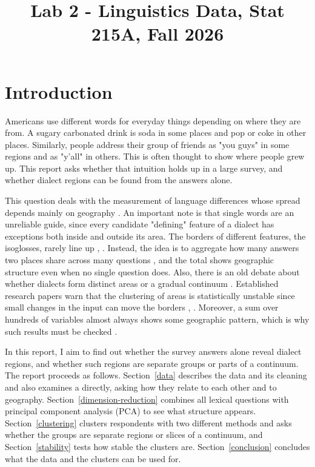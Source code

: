 \documentclass[10pt,letterpaper]{article}
\title{Lab 2 - Linguistics Data, Stat 215A, Fall 2026\vspace{-2em}}
\author{}
\date{}
\begin{document}
\maketitle

\section{Introduction}\label{introduction}

Americans use different words for everyday things depending on where they are from. A sugary carbonated drink is soda in some places and pop or coke in other places. Similarly, people address their group of friends as "you guys" in some regions and as "y'all" in others. This is often thought to show where people grew up. This report asks whether that intuition holds up in a large survey, and whether dialect regions can be found from the answers alone.

This question deals with the measurement of language differences whose spread depends mainly on geography \cite[p.~245]{nerbonne2003introducing}. An important note is that single words are an unreliable guide, since every candidate "defining" feature of a dialect has exceptions both inside and outside its area. The borders of different features, the isoglosses, rarely line up \cite[p.~246]{nerbonne2003introducing}, \cite[p.~388]{nerbonne2006progress}. Instead, the idea is to aggregate how many answers two places share across many questions \cite[p.~248]{nerbonne2003introducing}, and the total shows geographic structure even when no single question does. Also, there is an old debate about whether dialects form distinct areas or a gradual continuum \cite[p.~246]{nerbonne2003introducing}. Established research papers warn that the clustering of areas is statistically unstable since small changes in the input can move the borders \cite[p.~253]{nerbonne2003introducing}, \cite[p.~394]{nerbonne2006progress}. Moreover, a sum over hundreds of variables almost always shows some geographic pattern, which is why such results must be checked \cite[p.~392]{nerbonne2006progress}.

In this report, I aim to find out whether the survey answers alone reveal dialect regions, and whether such regions are separate groups or parts of a continuum. The report proceeds as follows. Section~\ref{data} describes the data and its cleaning and also examines a directly, asking how they relate to each other and to geography. Section~\ref{dimension-reduction} combines all \nQuestions{} lexical questions with principal component analysis (PCA) to see what structure appears. Section~\ref{clustering} clusters respondents with two different methods and asks whether the groups are separate regions or slices of a continuum, and Section~\ref{stability} tests how stable the clusters are. Section~\ref{conclusion} concludes what the data and the clusters can be used for.
\end{document}
